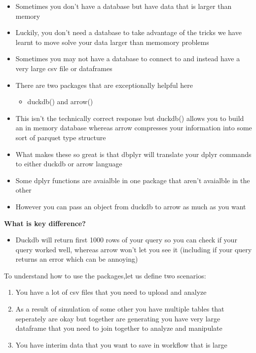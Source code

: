 \documentclass[
  letterpaper,
  DIV=11,
  numbers=noendperiod]{scrreprt}
\providecommand{\tightlist}{%
  \setlength{\itemsep}{0pt}\setlength{\parskip}{0pt}}\usepackage{longtable,booktabs,array}
\begin{document}
\begin{itemize}
\item
  Sometimes you don't have a database but have data that is larger than
  memory
\item
  Luckily, you don't need a database to take advantage of the tricks we
  have learnt to move solve your data larger than memomory problems
\item
  Sometimes you may not have a database to connect to and instead have a
  very large csv file or dataframes
\item
  There are two packages that are exceptionally helpful here

  \begin{itemize}
  \tightlist
  \item
    duckdb() and arrow()
  \end{itemize}
\item
  This isn't the technically correct response but duckdb() allows you to
  build an in memory database whereas arrow compresses your information
  into some sort of parquet type structure
\item
  What makes these so great is that dbplyr will translate your dplyr
  commands to either duckdb or arrow language
\item
  Some dplyr functions are avaialble in one package that aren't
  avaialble in the other
\item
  However you can pass an object from duckdb to arrow as much as you
  want
\end{itemize}

\textbf{What is key difference?}

\begin{itemize}
\tightlist
\item
  Duckdb will return first 1000 rows of your query so you can check if
  your query worked well, whereas arrow won't let you see it (including
  if your query returns an error which can be annoying)
\end{itemize}

To understand how to use the packages,let us define two scenarios:

\begin{enumerate}
\def\labelenumi{\arabic{enumi})}
\tightlist
\item
  You have a lot of csv files that you need to upload and analyze
\item
  As a result of simulation of some other you have multiple tables that
  seperately are okay but together are generating you have very large
  dataframe that you need to join together to analyze and manipulate
\item
  You have interim data that you want to save in workflow that is large
\end{enumerate}
\end{document}
